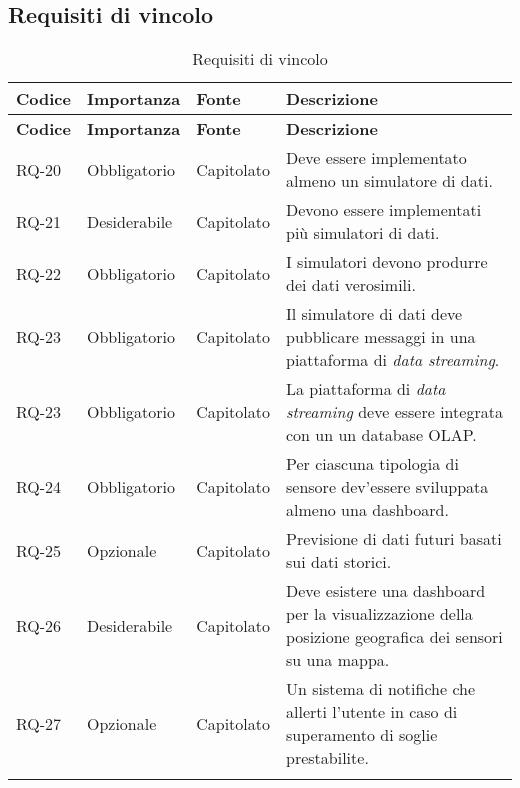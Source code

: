 \subsection{Requisiti di vincolo}
\begin{longtable}{|>{\centering\arraybackslash}m{}|>{\centering\arraybackslash}m{}|>{\centering\arraybackslash}m{}|>{\centering\arraybackslash}m{}|}
	\hline
	\textbf{Codice} & \textbf{Importanza} & \textbf{Fonte} & \textbf{Descrizione}                                                                                    \\\hline
	\endfirsthead
	\textbf{Codice} & \textbf{Importanza} & \textbf{Fonte} & \textbf{Descrizione}                                                                                    \\\hline
	\endhead
	RQ-20           & Obbligatorio        & Capitolato     & Deve essere implementato almeno un simulatore di dati.                                                  \\\hline
	RQ-21           & Desiderabile        & Capitolato     & Devono essere implementati più simulatori di dati.                                                      \\\hline
	RQ-22           & Obbligatorio        & Capitolato     & I simulatori devono produrre dei dati verosimili.                                                       \\\hline
	RQ-23           & Obbligatorio        & Capitolato     & Il simulatore di dati deve pubblicare messaggi in una piattaforma di \textit{data streaming}.           \\\hline
	RQ-23           & Obbligatorio        & Capitolato     & La piattaforma di \textit{data streaming} deve essere integrata con un un database OLAP.                \\\hline
	RQ-24           & Obbligatorio        & Capitolato     & Per ciascuna tipologia di sensore dev'essere sviluppata almeno una dashboard.                           \\\hline
	RQ-25           & Opzionale           & Capitolato     & Previsione di dati futuri basati sui dati storici.                                                      \\\hline
	RQ-26           & Desiderabile        & Capitolato     & Deve esistere una dashboard per la visualizzazione della posizione geografica dei sensori su una mappa. \\\hline
	RQ-27           & Opzionale           & Capitolato     & Un sistema di notifiche che allerti l'utente in caso di superamento di soglie prestabilite.             \\\hline
	\caption{Requisiti di vincolo}
	\label{table:3}
\end{longtable}


